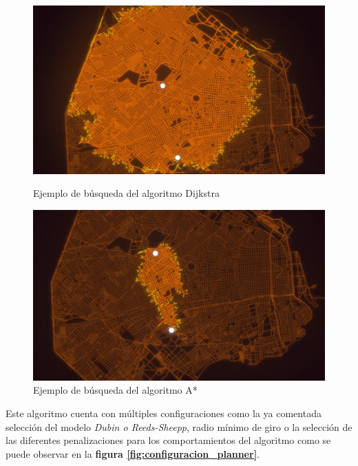 \begin{figure}[htbp]
  \centering
  \begin{minipage}[b]{0.45\textwidth}
    \centering
    \includegraphics[width=\textwidth]{images/dijstra.png}
    \caption{Ejemplo de búsqueda del algoritmo Dijkstra}
    \label{fig:dijstra}
  \end{minipage}
  \hfill
  \begin{minipage}[b]{0.45\textwidth}
    \centering
    \includegraphics[width=\textwidth]{images/a_star.png}
    \caption{Ejemplo de búsqueda del algoritmo A*}
    \label{fig:a_star}
  \end{minipage}
\end{figure}

Este algoritmo cuenta con múltiples configuraciones como la ya comentada selección del modelo \textit{Dubin o Reeds-Sheepp}, radio mínimo de giro 
o la selección de las diferentes penalizaciones para los comportamientos del algoritmo como se puede observar en la \textbf{figura \ref{fig:configuracion_planner}}.

